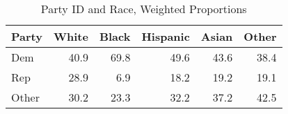 \begin{table}[ht]
\centering
\begin{tabular}{lrrrrr}
  \toprule
{\textbf{Party}} & {\textbf{White}} & {\textbf{Black}} & {\textbf{Hispanic}} & {\textbf{Asian}} & {\textbf{Other}} \\ 
  \midrule
Dem & 40.9 & 69.8 & 49.6 & 43.6 & 38.4 \\ 
  Rep & 28.9 & 6.9 & 18.2 & 19.2 & 19.1 \\ 
  Other & 30.2 & 23.3 & 32.2 & 37.2 & 42.5 \\ 
   \bottomrule
\end{tabular}
\caption{Party ID and Race, Weighted Proportions} 
\label{tab:party_race_comp}
\end{table}
